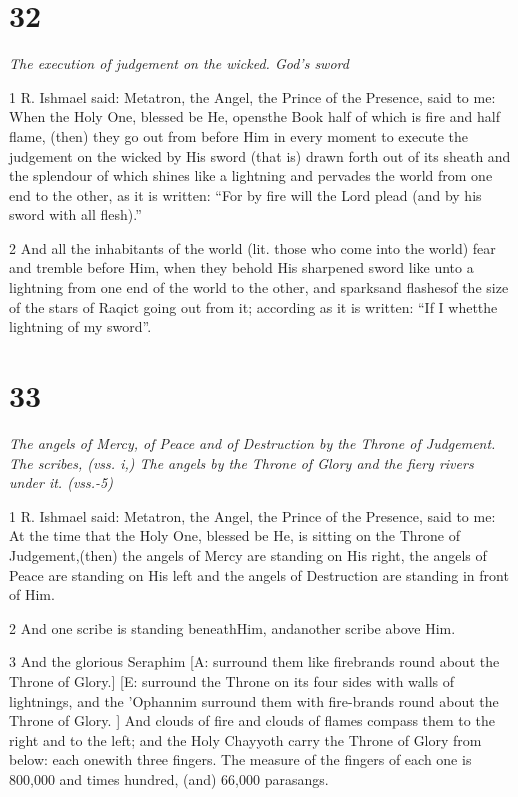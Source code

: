 \chapter{32}

\par \textit{The execution of judgement on the wicked. God's sword}

\par 1 R. Ishmael said: Metatron, the Angel, the Prince of the Presence, said to me: When the Holy One, blessed be He, opensthe Book half of which is fire and half flame, (then) they go out from before Him in every moment to execute the judgement on the wicked by His sword (that is) drawn forth out of its sheath and the splendour of which shines like a lightning and pervades the world from one end to the other, as it is written: “For by fire will the Lord plead (and by his sword with all flesh).”

\par 2 And all the inhabitants of the world (lit. those who come into the world) fear and tremble before Him, when they behold His sharpened sword like unto a lightning from one end of the world to the other, and sparksand flashesof the size of the stars of Raqict going out from it; according as it is written: “If I whetthe lightning of my sword”. 


\chapter{33}

\par \textit{The angels of Mercy, of Peace and of Destruction by the Throne of Judgement. The scribes, (vss. i,) The angels by the Throne of Glory and the fiery rivers under it. (vss.-5)}

\par 1 R. Ishmael said: Metatron, the Angel, the Prince of the Presence, said to me: At the time that the Holy One, blessed be He, is sitting on the Throne of Judgement,(then) the angels of Mercy are standing on His right, the angels of Peace are standing on His left and the angels of Destruction are standing in front of Him.

\par 2 And one scribe is standing beneathHim, andanother scribe above Him. 

\par 3 And the glorious Seraphim [A: surround them like firebrands round about the Throne of Glory.] [E: surround the Throne on its four sides with walls of lightnings, and the 'Ophannim  surround them with fire-brands round about the Throne of Glory. ] And clouds of fire and clouds of flames compass them to the right and to the left; and the Holy Chayyoth carry the Throne of Glory from below: each onewith three fingers. The measure of the fingers of each one is 800,000 and times hundred, (and) 66,000 parasangs. 

